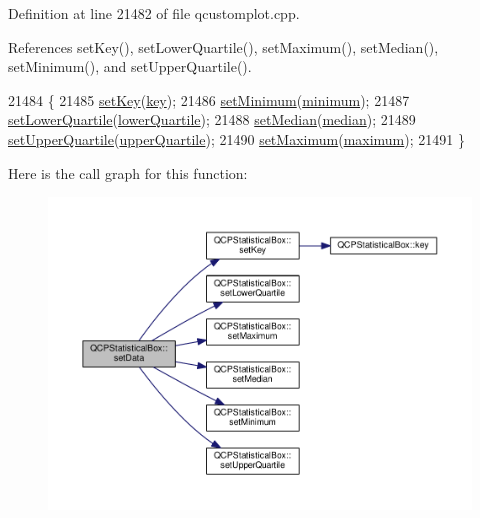 Definition at line 21482 of file qcustomplot.\+cpp.



References set\+Key(), set\+Lower\+Quartile(), set\+Maximum(), set\+Median(), set\+Minimum(), and set\+Upper\+Quartile().


\begin{DoxyCode}
21484                                                                       \{
21485   \hyperlink{class_q_c_p_statistical_box_a84a1c6d34b2f9af40bca0c527d51e97e}{setKey}(\hyperlink{class_q_c_p_statistical_box_a767af754f39872d6308b900a0d1758ca}{key});
21486   \hyperlink{class_q_c_p_statistical_box_a84ff7cc61ba44890f0c3e0c99c19941e}{setMinimum}(\hyperlink{class_q_c_p_statistical_box_acd94c05d59c05d9146d3b60d9f52df82}{minimum});
21487   \hyperlink{class_q_c_p_statistical_box_a680941af5e23d902013962fa67223f9e}{setLowerQuartile}(\hyperlink{class_q_c_p_statistical_box_af9c4a98f5ca95b5a5a8b140f57b64ace}{lowerQuartile});
21488   \hyperlink{class_q_c_p_statistical_box_a65970e77a897da4ecb4b15300868aad3}{setMedian}(\hyperlink{class_q_c_p_statistical_box_a44abdee617fe0bca72e6a2ea3fd492de}{median});
21489   \hyperlink{class_q_c_p_statistical_box_a65a1375f941c5a2077b5201229e89346}{setUpperQuartile}(\hyperlink{class_q_c_p_statistical_box_abd15951907b54343a89b1f7feddcb7a7}{upperQuartile});
21490   \hyperlink{class_q_c_p_statistical_box_acec5ad1901f00f2c5387cfb4d9787eb3}{setMaximum}(\hyperlink{class_q_c_p_statistical_box_a928bcf07dd2176affad91d85be03172f}{maximum});
21491 \}
\end{DoxyCode}


Here is the call graph for this function\+:\nopagebreak
\begin{figure}[H]
\begin{center}
\leavevmode
\includegraphics[width=350pt]{class_q_c_p_statistical_box_adf50c57b635edb12470c0e4a986aff37_cgraph}
\end{center}
\end{figure}


